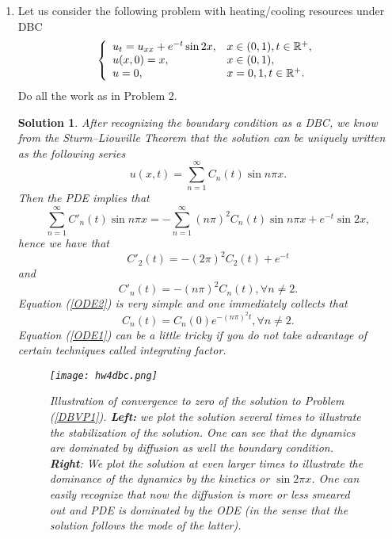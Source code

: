 \documentclass[6pt]{article}
\newtheorem{solution}{Solution}
\numberwithin{equation}{section}
\def\mathbb{\Bbb}
\begin{document}
\begin{enumerate}
\item  Let us consider the following problem with heating/cooling resources under DBC
\begin{equation}\label{DBVP1}
\left\{
\begin{array}{ll}
u_t=u_{xx}+e^{-t}\sin 2x,& x\in (0,1), t\in\mathbb R^+,\\
u(x,0)=x, &x\in(0,1), \\
u=0, & x=0,1, t\in\mathbb R^+.
\end{array}
\right.
\end{equation}
Do all the work as in Problem 2.
\begin{solution}
After recognizing the boundary condition as a DBC, we know from the Sturm--Liouville Theorem that the solution can be uniquely written as the following series
\[u(x,t)=\sum_{n=1}^\infty C_n(t)\sin n\pi x.\]
Then the PDE implies that
\[\sum_{n=1}^\infty C'_n(t)\sin n\pi x=-\sum_{n=1}^\infty(n\pi)^2C_n(t)\sin n\pi x+e^{-t}\sin 2x,\]
hence we have that
\begin{equation}\label{ODE1}
C'_2(t)=-(2\pi)^2C_2(t)+e^{-t}
\end{equation}
and
\begin{equation}\label{ODE2}
C'_n(t)=-(n\pi)^2C_n(t), \forall n\neq 2.
\end{equation}
Equation (\ref{ODE2}) is very simple and one immediately collects that
\[C_n(t)=C_n(0)e^{-(n\pi)^2t}, \forall n\neq 2.\]
Equation (\ref{ODE1}) can be a little tricky if you do not take advantage of certain techniques called integrating factor.
\begin{figure}[h!]%
  \centering
  \texttt{[image: hw4dbc.png]}\\
  \caption{Illustration of convergence to zero of the solution to Problem (\ref{DBVP1}).  \textbf{Left:} we plot the solution several times to illustrate the stabilization of the solution.  One can see that the dynamics are dominated by diffusion as well the boundary condition.  \textbf{Right}:  We plot the solution at even larger times to illustrate the dominance of the dynamics by the kinetics or $\sin 2\pi x$.  One can easily recognize that now the diffusion is more or less smeared out and PDE is dominated by the ODE (in the sense that the solution follows the mode of the latter).}\label{ }
\end{figure}


\end{solution}
\end{enumerate}
\end{document}
